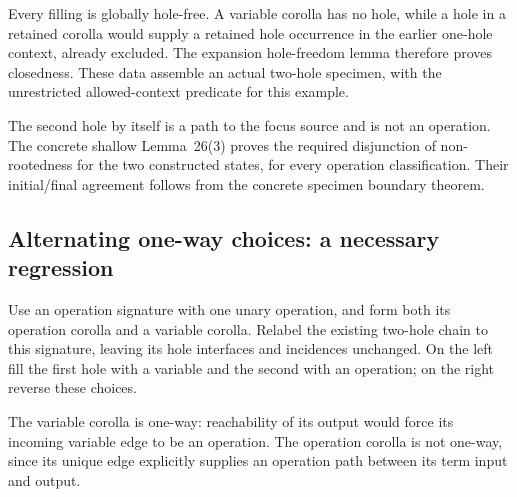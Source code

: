 Every filling is globally hole-free. A variable corolla has no hole, while a
hole in a retained corolla would supply a retained hole occurrence in the
earlier one-hole context, already excluded. The expansion hole-freedom lemma
therefore proves closedness. These data assemble an actual two-hole specimen,
with the unrestricted allowed-context predicate for this example.

The second hole by itself is a path to the focus source and is not an
operation. The concrete shallow Lemma~26(3) proves the required disjunction
of non-rootedness for the two constructed states, for every operation
classification. Their initial/final agreement follows from the concrete
specimen boundary theorem.

\subsection{Alternating one-way choices: a necessary regression}
Use an operation signature with one unary operation, and form both its
operation corolla and a variable corolla. Relabel the existing two-hole chain
to this signature, leaving its hole interfaces and incidences unchanged.
On the left fill the first hole with a variable and the second with an
operation; on the right reverse these choices.

The variable corolla is one-way: reachability of its output would force its
incoming variable edge to be an operation. The operation corolla is not
one-way, since its unique edge explicitly supplies an operation path between
its term input and output.

